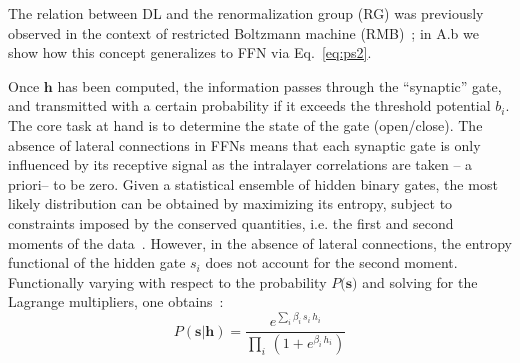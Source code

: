 \documentclass{article}
\begin{document}
%
The relation between  DL and the renormalization group (RG) was previously observed in the context of restricted Boltzmann machine (RMB)~\cite{mehta}; in A.b we show how this concept generalizes to FFN via Eq.~\eqref{eq:ps2}.

Once $\mathbf{h}$ has been computed, the information passes through the ``synaptic'' gate, and transmitted with a certain probability if it exceeds the threshold potential $b_i$. The core task at hand is to determine the state of the gate (open/close). The absence of lateral connections in FFNs means that each synaptic gate is only influenced by its receptive signal as the intralayer correlations are taken -- a priori-- to be zero. Given a statistical ensemble of hidden binary gates, the most likely distribution  can be obtained by maximizing its entropy, subject to constraints imposed by the conserved quantities, i.e. the first and second moments of the data~\cite{zecchina, mckay}. However, in the absence of lateral connections, the entropy functional of the hidden gate $s_i$ does not account for the second moment.
%
%
Functionally varying with respect to the probability $P(\mathbf{s)}$ and solving for the Lagrange multipliers, one  obtains~\cite{roberto}:
%
%
\begin{equation} \label{eq:entropy4}
P(\mathbf{s} | \mathbf{h}) = \frac{e^{ \sum_i \beta_i  \, s_i \, h_i }}{\prod_i \, \left( 1+ e^{\beta_i \, h_i} \right)} %
\end{equation}
%
\end{document}
